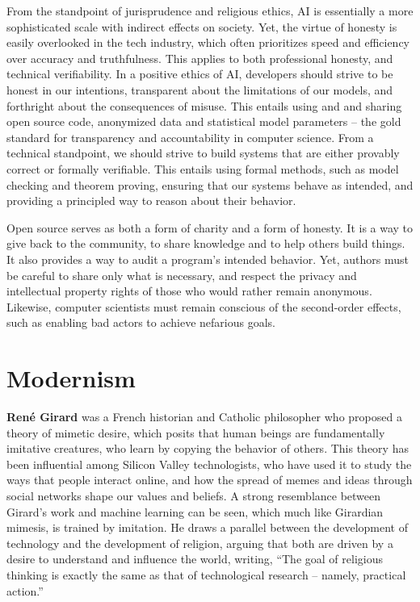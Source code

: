 \documentclass[sigplan,nonacm]{acmart}\settopmatter{printfolios=false,printccs=false,printacmref=false}
\begin{document}
  From the standpoint of jurisprudence and religious ethics, AI is essentially a more sophisticated scale with indirect effects on society. Yet, the virtue of honesty is easily overlooked in the tech industry, which often prioritizes speed and efficiency over accuracy and truthfulness. This applies to both professional honesty, and technical verifiability. In a positive ethics of AI, developers should strive to be honest in our intentions, transparent about the limitations of our models, and forthright about the consequences of misuse. This entails using and and sharing open source code, anonymized data and statistical model parameters -- the gold standard for transparency and accountability in computer science. From a technical standpoint, we should strive to build systems that are either provably correct or formally verifiable. This entails using formal methods, such as model checking and theorem proving, ensuring that our systems behave as intended, and providing a principled way to reason about their behavior.

  Open source serves as both a form of charity and a form of honesty. It is a way to give back to the community, to share knowledge and to help others build things. It also provides a way to audit a program's intended behavior. Yet, authors must be careful to share only what is necessary, and respect the privacy and intellectual property rights of those who would rather remain anonymous. Likewise, computer scientists must remain conscious of the second-order effects, such as enabling bad actors to achieve nefarious goals.

  \section{Modernism}

  \textbf{Ren\'e Girard} was a French historian and Catholic philosopher who proposed a theory of mimetic desire, which posits that human beings are fundamentally imitative creatures, who learn by copying the behavior of others. This theory has been influential among Silicon Valley technologists, who have used it to study the ways that people interact online, and how the spread of memes and ideas through social networks shape our values and beliefs. A strong resemblance between Girard's work and machine learning can be seen, which much like Girardian mimesis, is trained by imitation. He draws a parallel between the development of technology and the development of religion, arguing that both are driven by a desire to understand and influence the world, writing, ``The goal of religious thinking is exactly the same as that of technological research -- namely, practical action.''~\cite{girard1977violence}
\end{document}
